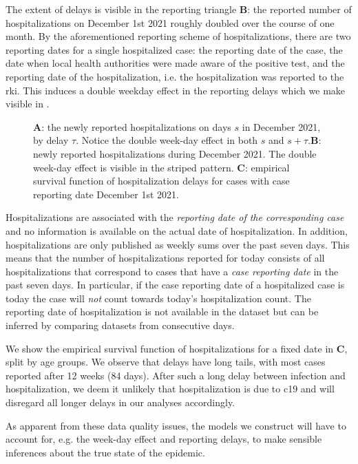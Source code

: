 The extent of delays is visible in the reporting triangle  \textbf{B}: the reported number of hospitalizations on December 1st 2021 roughly doubled over the course of one month. By the aforementioned reporting scheme of hospitalizations, there are two reporting dates for a single hospitalized case: the reporting date of the case, the date when local health authorities were made aware of the positive test, and the reporting date of the hospitalization, i.e. the hospitalization was reported to the \acrshort{rki}. This induces a double weekday effect in the reporting delays which we make visible in .

\begin{figure}
    \resizebox{\textwidth}{!}{%
    }
    \caption{\textbf{A}: the newly reported hospitalizations on days $s$ in December 2021, by delay $\tau$. Notice the double week-day effect in both $s$ and $s+\tau$.\textbf{B}: newly reported hospitalizations during December 2021. The double week-day effect is visible in the striped pattern. \textbf{C}: empirical survival function of hospitalization delays for cases with case reporting date December 1st 2021.}
    \label{fig:double_weekday_effect_hosp}
\end{figure}

Hospitalizations are associated with the \emph{reporting date of the corresponding case} and no information is available on the actual date of hospitalization. In addition, hospitalizations are only published as weekly sums over the past seven days. This means that the number of hospitalizations reported for today consists of all hospitalizations that correspond to cases that have a \emph{case reporting date} in the past seven days. In particular, if the case reporting date of a hospitalized case is today the case will \emph{not} count towards today's hospitalization count. The reporting date of hospitalization is not available in the dataset but can be inferred by comparing datasets from consecutive days.

We show the empirical survival function of hospitalizations for a fixed date in  \textbf{C}, split by age groups. We observe that delays have long tails, with most cases reported after 12 weeks (84 days). After such a long delay between infection and hospitalization, we deem it unlikely that hospitalization is due to \acrshort{c19} and will disregard all longer delays in our analyses accordingly. 

As apparent from these data quality issues, the models we construct will have to account for, e.g. the week-day effect and reporting delays, to make sensible inferences about the true state of the epidemic. 